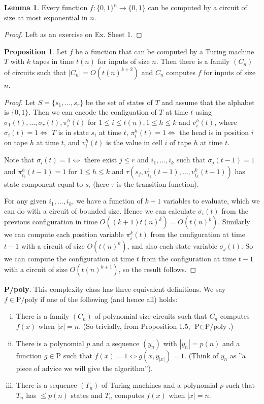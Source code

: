 \documentclass{article}
\theoremstyle{definition}
\newtheorem{lemma}[theorem]{Lemma}
\newtheorem{prop}[theorem]{Proposition}
\begin{document}
\begin{lemma}
    Every function $f : \{0,1\}^n \to \{0,1\}$ can be computed by a circuit of size at most exponential in $n$.
\end{lemma}
\begin{proof}
    Left as an exercise on Ex. Sheet 1. 
\end{proof}
\begin{prop}\label{prop1.5}
    Let $f$ be a function that can be computed by a Turing machine $T$ with $k$ tapes in time $t(n)$ for inputs of size $n$. Then there is a family $(C_n)$ of circuits such that $|C_n| = O(t(n)^{k+2})$ and $C_n$ computes $f$ for inputs of size $n$. 
\end{prop}
\begin{proof}
    Let $S = \{s_1,\ldots,s_r\}$ be the set of states of $T$ and assume that the alphabet is $\{0,1\}$. Then we can encode the configuation of $T$ at time $t$ using $\sigma_1(t),\ldots,\sigma_r(t), \pi_{i}^h(t)$ for $1\le i\le t(n),1\le h\le k$ and $v_i^h(t)$, where $\sigma_i(t) = 1 \iff$ $T$ is in state $s_i$ at time $t$, $\pi_i^h(t) = 1 \iff$ the head is in position $i$ on tape $h$ at time $t$, and $v_i^h(t)$ is the value in cell $i$ of tape $h$ at time $t$.
    \vspace{1mm}
     
    Note that $\sigma_i(t) = 1 \iff$ there exist $j\le r$ and $i_1,\ldots,i_k$ such that $\sigma_j(t-1)=1$ and $\pi_{i_b}^h(t-1) = 1$ for $1\le h\le k$ and $\tau(s_j, v_{i_1}^1(t-1), \ldots, v_{i_k}^k(t-1))$ has state component equal to $s_i$ (here $\tau$ is the transition function).  
    \vspace{1mm}
     
    For any given $i_1,\ldots,i_k$, we have a function of $k+1$ variables to evaluate, which we can do with a circuit of bounded size. Hence we can calculate $\sigma_i(t)$ from the previous configuration in time $O((k+1)t(n)^k) = O(t(n)^k)$. Similarly we can compute each position variable $\pi_i^k(t)$ from the configuration at time $t-1$ with a circuit of size $O(t(n)^k)$, and also each state variable $\sigma_j(t)$. So we can compute the configuration at time $t$ from the configuration at time $t-1$ with a circuit of size $O(t(n)^{k+1})$, so the result follows.
\end{proof}
\textbf{P/poly}. This complexity class has three equivalent definitions. We say $f \in \text{P/poly}$ if one of the following (and hence all) holds:
\begin{enumerate}[(i)]
    \item There is a family $(C_n)$ of polynomial size circuits such that $C_n$ computes $f(x)$ when $\left|x \right| = n$. (So trivially, from Proposition 1.5, $\text{P} \subset \text{P/poly}$.)
    \item There is a polynomial $p$ and a sequence $(y_n)$ with $\left|y_n \right| = p(n)$ and a function $g \in \text{P}$ such that $f(x)=1 \iff g(x,y_{\left|x \right|})=1$. (Think of $y_n$ as ''a piece of advice we will give the algorithm'').
    \item There is a sequence $(T_n)$ of Turing machines and a polynomial $p$ such that $T_n$ has $\le p(n)$ states and $T_n$ computes $f(x)$ when $\left|x \right|=n$.
\end{enumerate}
\end{document}

